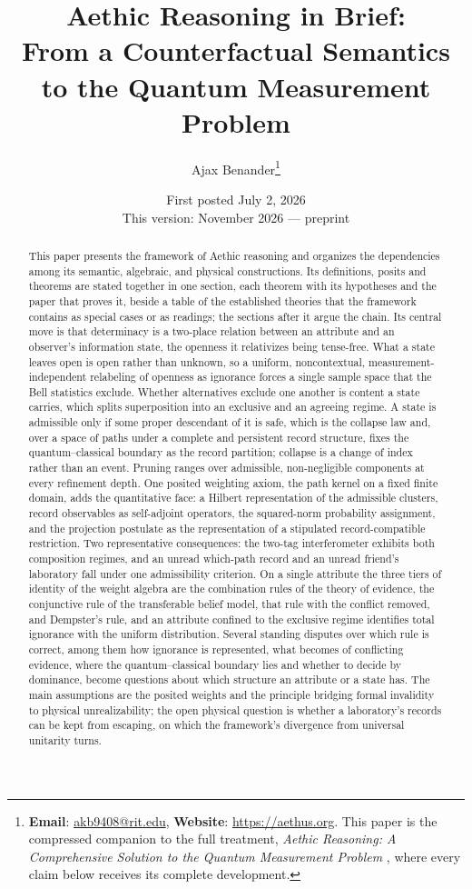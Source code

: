 \documentclass[11pt]{article}
\title{Aethic Reasoning in Brief:\\[0.1em] \large From a Counterfactual Semantics to the Quantum Measurement Problem}
\author{Ajax Benander\thanks{\textbf{Email}: \href{mailto:akb9408@rit.edu}{akb9408@rit.edu}, \textbf{Website}: \url{https://aethus.org}. This paper is the compressed companion to the full treatment, \textit{Aethic Reasoning: A Comprehensive Solution to the Quantum Measurement Problem} \cite{Aethus}, where every claim below receives its complete development.}}
\date{First posted July 2, 2026\\ {\small This version: November 2026 --- preprint}}
\theoremstyle{definition}
\begin{document}
\maketitle\vspace{-0.75cm}

\begin{abstract}
\noindent This paper presents the framework of Aethic reasoning and organizes the dependencies among its semantic, algebraic, and physical constructions. Its definitions, posits and theorems are stated together in one section, each theorem with its hypotheses and the paper that proves it, beside a table of the established theories that the framework contains as special cases or as readings; the sections after it argue the chain. Its central move is that determinacy is a two-place relation between an attribute and an observer's information state, the openness it relativizes being tense-free. What a state leaves open is open rather than unknown, so a uniform, noncontextual, measurement-independent relabeling of openness as ignorance forces a single sample space that the Bell statistics exclude. Whether alternatives exclude one another is content a state carries, which splits superposition into an exclusive and an agreeing regime. A state is admissible only if some proper descendant of it is safe, which is the collapse law and, over a space of paths under a complete and persistent record structure, fixes the quantum--classical boundary as the record partition; collapse is a change of index rather than an event. Pruning ranges over admissible, non-negligible components at every refinement depth. One posited weighting axiom, the path kernel on a fixed finite domain, adds the quantitative face: a Hilbert representation of the admissible clusters, record observables as self-adjoint operators, the squared-norm probability assignment, and the projection postulate as the representation of a stipulated record-compatible restriction. Two representative consequences: the two-tag interferometer exhibits both composition regimes, and an unread which-path record and an unread friend's laboratory fall under one admissibility criterion. On a single attribute the three tiers of identity of the weight algebra are the combination rules of the theory of evidence, the conjunctive rule of the transferable belief model, that rule with the conflict removed, and Dempster's rule, and an attribute confined to the exclusive regime identifies total ignorance with the uniform distribution. Several standing disputes over which rule is correct, among them how ignorance is represented, what becomes of conflicting evidence, where the quantum--classical boundary lies and whether to decide by dominance, become questions about which structure an attribute or a state has. The main assumptions are the posited weights and the principle bridging formal invalidity to physical unrealizability; the open physical question is whether a laboratory's records can be kept from escaping, on which the framework's divergence from universal unitarity turns.

\end{abstract}
\end{document}
